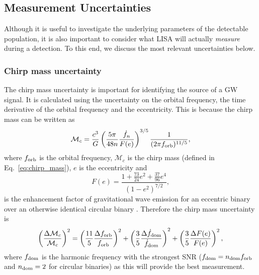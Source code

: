 \subsection{Measurement Uncertainties}\label{sec:measurement_uncertainties}
Although it is useful to investigate the underlying parameters of the detectable population, it is also important to consider what LISA will actually \textit{measure} during a detection. To this end, we discuss the most relevant uncertainties below.

\subsubsection{Chirp mass uncertainty}

The chirp mass uncertainty is important for identifying the source of a GW signal. It is calculated using the uncertainty on the orbital frequency, the time derivative of the orbital frequency and the eccentricity. This is because the chirp mass can be written as
\begin{equation}
    \mathcal{M}_c = \frac{c^3}{G} \left( \frac{5 \pi}{48 n} \frac{\dot{f}_{n}}{F(e)} \right)^{3/5} \frac{1}{(2 \pi f_{\rm orb})^{11/5}},
\end{equation}
where $f_{\rm orb}$ is the orbital frequency, $\mathcal{M}_{c}$ is the chirp mass (defined in Eq.~\ref{eq:chirp_mass}), $e$ is the eccentricity and
\begin{equation}
    F(e) = \frac{1 + \frac{73}{24} e^2 + \frac{37}{96} e^4}{(1 - e^2)^{7/2}},
\end{equation}
is the enhancement factor of gravitational wave emission for an eccentric binary over an otherwise identical circular binary \citep[][Eq.~17]{Peters+1963}. Therefore the chirp mass uncertainty is
\begin{equation}\label{eq:chirp_mass_uncertainty}
    \qty( \frac{\Delta \mathcal{M}_c}{\mathcal{M}_c} )^2 = \left( \frac{11}{5} \frac{\Delta f_{\rm orb}}{f_{\rm orb}} \right)^2 + \left( \frac{3}{5} \frac{\Delta \dot{f}_{\rm dom}}{\dot{f}_{\rm dom}} \right)^2 + \left( \frac{3}{5} \frac{\Delta F(e)}{F(e)} \right)^2,
\end{equation}
where $f_{\rm dom}$ is the harmonic frequency with the strongest SNR ($f_{\rm dom} = n_{\rm dom} f_{\rm orb}$ and $n_{\rm dom} = 2$ for circular binaries) as this will provide the best measurement.

